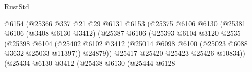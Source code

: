 \begin{lexlean}{RustStd}
\begin{coremodule}
                                                @6154
                                                (@25366
                                                  @337
                                                  @21
                                                  @29
                                                  @6131
                                                  @6153
                                                  (@25375
                                                    @6106
                                                    @6130
                                                    (@25381
                                                      @6106
                                                      (@3408 @6130 @3412)
                                                      (@25387
                                                        @6106
                                                        (@25393
                                                          @6104
                                                          @3120
                                                          @2535
                                                          (@25398
                                                            @6104
                                                            (@25402
                                                              @6102
                                                              @3412
                                                              (@25014
                                                                @6098
                                                                @6100
                                                                (@25023 @6088 @3632 @25033 @11397))
                                                              @24879))
                                                          @25417
                                                          @25420
                                                          @25423
                                                          @25426
                                                          @10834))
                                                      (@25434
                                                        @6130
                                                        @3412
                                                        (@25438
                                                          @6130
                                                          (@25444
                                                            @6128

\end{coremodule}
\end{lexlean}
